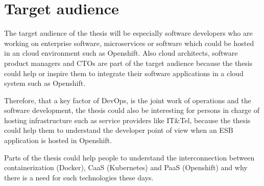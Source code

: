 \section{Target audience}
\label{sec:target-audience}
The target audience of the thesis will be especially software developers who are working on enterprise software, microservices or software which could be hosted in an cloud environment such as Openshift. Also cloud architects, software product managers and CTOs are part of the target audience because the thesis could help or inspire them to integrate their software applications in a cloud system such as Openshift.

Therefore, that a key factor of DevOps, is the joint work of operations and the software development, the thesis could also be interesting for persons in charge of hosting infrastructure such as service providers like IT\&Tel, because the thesis could help them to understand the developer point of view when an ESB application is hosted in Openshift.

Parts of the thesis could help people to understand the interconnection between containerization (Docker), CaaS (Kubernetes) and PaaS (Openshift) and why there is a need for such technologies these days.





